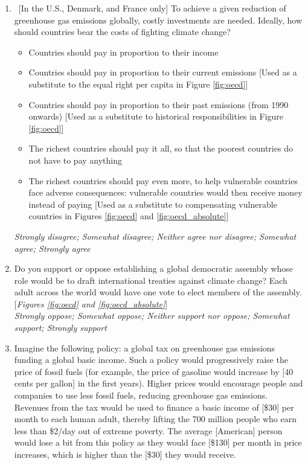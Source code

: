 \begin{enumerate}
\item \label{q:burden_sharing_asterisk} ~[In the U.S., Denmark, and France only] To achieve a given reduction of greenhouse gas emissions globally, costly investments are needed. %
Ideally, how should countries bear the costs of fighting climate change?
 \begin{itemize}
\item Countries should pay in proportion to their income
\item Countries should pay in proportion to their current emissions [Used as a substitute to the equal right per capita in Figure \ref{fig:oecd}]
\item Countries should pay in proportion to their past emissions (from 1990 onwards) [Used as a substitute to historical responsibilities in Figure \ref{fig:oecd}]
\item The richest countries should pay it all, so that the poorest countries do not have to pay anything
\item The richest countries should pay even more, to help vulnerable countries face adverse consequences: vulnerable countries would then receive money instead of paying [Used as a substitute to compensating vulnerable countries in Figures \ref{fig:oecd} and \ref{fig:oecd_absolute}]
\end{itemize} 
\textit{Strongly disagree; Somewhat disagree; Neither agree nor disagree; Somewhat agree; Strongly agree}
\item Do you support or oppose establishing a global democratic assembly whose role would be to draft international treaties against climate change? Each adult across the world would have one vote to elect members of the assembly. [\textit{Figures \ref{fig:oecd} and \ref{fig:oecd_absolute}}]
\\ \textit{Strongly oppose; Somewhat oppose; Neither support nor oppose; Somewhat support; Strongly support}
\item \label{q:global_tax_dividend} Imagine the following policy: a global tax on greenhouse gas emissions funding a global basic income. 
Such a policy would progressively raise the price of fossil fuels (for example, the price of gasoline would increase by [40 cents per gallon] in the first years). Higher prices would encourage people and companies to use less fossil fuels, reducing greenhouse gas emissions. Revenues from the tax would be used to finance a basic income of [\$30] per month to each human adult, thereby lifting the 700 million people who earn less than \$2/day out of extreme poverty. 
The average [American] person would lose a bit from this policy as they would face [\$130] per month in price increases, which is higher than the [\$30] they would receive.


\end{enumerate}
